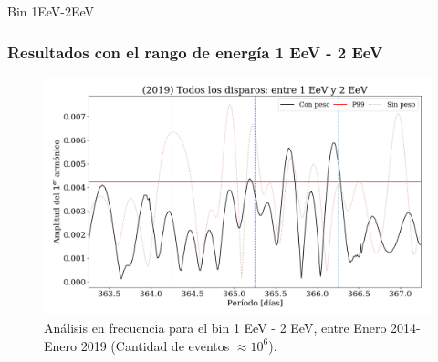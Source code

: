 \documentclass{beamer}
\begin{document}
\begin{frame}{Bin 1EeV-2EeV}
\frametitle{Resultados con el rango de energía 1 EeV - 2 EeV}

\begin{figure}[htbp]
  \centering
  \includegraphics[width=\textwidth]{./../../Python/xx2019_AllTriggers_1_2_EeV_con_vs_sin_peso.png}
  \caption{Análisis en frecuencia para el bin 1 EeV - 2 EeV, entre Enero 2014- Enero 2019 (Cantidad de eventos $ \approx 10^6$).}
\end{figure}

\end{frame}
\end{document}
